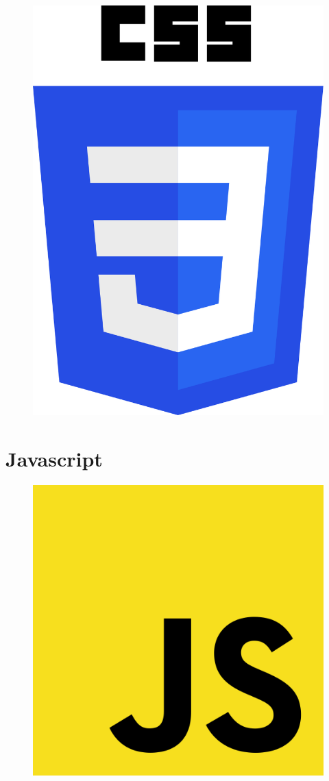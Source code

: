 \lipsum[1]
\begin{figure}
	\includegraphics[width=0.19\paperwidth]{./img/css}
\end{figure}
\lipsum[1]

\section{Javascript}

\lipsum[1]
\begin{figure}
	\includegraphics[width=0.19\paperwidth]{./img/javascript}
\end{figure}
\lipsum[1]